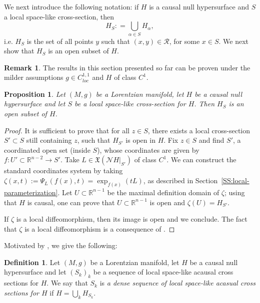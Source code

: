\documentclass[12pt,a4paper]{amsart}
\theoremstyle{plain}
\newtheorem{proposition}[lemma]{Proposition}
\theoremstyle{definition}
\newtheorem{definition}[lemma]{Definition}
\newtheorem{remark}[lemma]{Remark}
\numberwithin{equation}{section}
\newcommand{\R}{\mathbb{R}}
\newcommand{\gflow}{\Psi}
\newcommand{\lparam}{\zeta}
\newcommand{\relation}{\mathcal{R}}
\newcommand{\vfield}{\mathfrak{X}}
\newcommand{\normal}{\mathscr{N}}
\begin{document}
%



We next introduce the following notation: if 
 $H$ is a causal null hypersurface and $S$  a local space-like
cross-section, then 
$$
H_S : = \bigcup_{\alpha \in S} H_{\alpha},
$$ 
i.e. $H_S$  is the set of all points $y$ such that $(x,y)\in\relation$,
for some $x\in S$.
%
We next show that $H_S$  is an open subset of $H$. 



  \begin{remark}
    The results in this section presented  so far can be proven
    under the milder assumptions $g\in C^{1,1}_{loc}$ and $H$ of class
    $C^1$.
  \end{remark}
%


\begin{proposition}\label{prop:HSopen}
Let $(M,g)$ be a Lorentzian manifold, let $H$ be a causal null hypersurface and let $S$ be a local space-like cross-section for $H$. 
Then  $H_S$ is an open subset of  $H$.
\end{proposition}

\begin{proof}
  It is sufficient to prove that for all $z\in S$, there exists a local cross-section $S'\subset S$ still containing $z$, such that $H_{S'}$ is open in $H$.
  Fix $z\in S$ and find $S'$, a coordinated open set (inside $S$),
  whose coordinates are given by $f:U'\subset \R^{n-2}\to S'$.
  Take $L\in\vfield(\normal H|_{S'})$ of class $C^1$.
  We can construct the standard coordinates system by taking
  $\lparam(x,t):=\gflow_L(f(x),t)=\exp_{f(x)}(tL)$, as described in
  Section~\ref{SS:local-parameterization}.
 Let $U\subset \R^{n-1}$ be the maximal definition domain of $\lparam$; using that $H$ is causal, one can prove that $U\subset \R^{n-1}$ is open and  $\lparam(U)=H_{S'}$.

  If $\lparam$ is a local diffeomorphism, then its image
  is open and we conclude.
%
  The fact that $\lparam$ is a local diffeomorphism is a consequence of
  .
\end{proof}

 Motivated by , we give the following:
\begin{definition}\label{def:denseSk}
Let $(M,g)$ be a Lorentzian manifold, let $H$ be a causal null hypersurface and let $(S_k)_k$ be a sequence of local space-like acausal cross sections for $H$. We say that $S_k$ is \emph{a dense sequence of local space-like acasual cross sections for $H$} if $H=\bigcup_k H_{S_k}$.
\end{definition}
\end{document}
